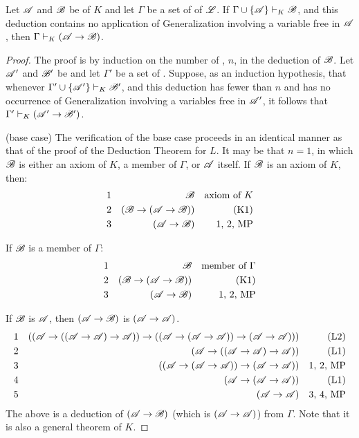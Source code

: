 \setcounter{definition}{7}
\begin{proposition}
  Let \(\mathscr{A}\) and \(\mathscr{B}\) be \wfs{} of \(K\) and let \(\Gamma\) be a set of \wfs{} of \(\mathscr{L}\). If \(\Gamma \cup \{\mathscr{A}\} \vdash_{K} \mathscr{B}\), and this deduction contains no application of Generalization involving a variable free in \(\mathscr{A}\), then \(\Gamma \vdash_{K} (\mathscr{A} \rightarrow \mathscr{B})\).

  \begin{proof}
    The proof is by induction on the number of \wfs{}, \(n\), in the deduction of \(\mathscr{B}\). Let \(\mathscr{A}'\) and \(\mathscr{B}'\) be \wfs{} and let \(\Gamma'\) be a set of \wfs{}. Suppose, as an induction hypothesis, that whenever \(\Gamma' \cup \{\mathscr{A}'\} \vdash_{K} \mathscr{B}'\), and this deduction has fewer than \(n\) \wfs{} and has no occurrence of Generalization involving a variables free in \(\mathscr{A}'\), it follows that \(\Gamma' \vdash_{K} (\mathscr{A}' \rightarrow \mathscr{B}')\).

    (base case) The verification of the base case proceeds in an identical manner as that of the proof of the Deduction Theorem for \(L\). It may be that \(n = 1\), in which \(\mathscr{B}\) is either an axiom of \(K\), a member of \(\Gamma\), or \(\mathscr{A}\) itself. If \(\mathscr{B}\) is an axiom of \(K\), then:
    \begin{align*}
      \text{1}&&
      \mathscr{B}&&
      \text{axiom of \(K\)}\\
      \text{2}&&
      (\mathscr{B} \rightarrow (\mathscr{A} \rightarrow \mathscr{B}))&&
      \text{(K1)}\\
      \text{3}&&
      (\mathscr{A} \rightarrow \mathscr{B})&&
      \text{1, 2, MP}
    \end{align*}

    If \(\mathscr{B}\) is a member of \(\Gamma\):
    \begin{align*}
      \text{1}&&
      \mathscr{B}&&
      \text{member of \(\Gamma\)}\\
      \text{2}&&
      (\mathscr{B} \rightarrow (\mathscr{A} \rightarrow \mathscr{B}))&&
      \text{(K1)}\\
      \text{3}&&
      (\mathscr{A} \rightarrow \mathscr{B})&&
      \text{1, 2, MP}
    \end{align*}

      If \(\mathscr{B}\) is \(\mathscr{A}\), then \((\mathscr{A} \rightarrow \mathscr{B})\) is \((\mathscr{A} \rightarrow \mathscr{A})\).
        \begin{align*}
          \text{1}&&
          ((\mathscr{A} \rightarrow ((\mathscr{A} \rightarrow \mathscr{A}) \rightarrow \mathscr{A})) \rightarrow ((\mathscr{A} \rightarrow (\mathscr{A} \rightarrow \mathscr{A})) \rightarrow (\mathscr{A} \rightarrow \mathscr{A})))&&
          \text{(L2)}\\
          \text{2}&&
          (\mathscr{A} \rightarrow ((\mathscr{A} \rightarrow \mathscr{A}) \rightarrow \mathscr{A}))&&
          \text{(L1)}\\
          \text{3}&&
          ((\mathscr{A} \rightarrow (\mathscr{A} \rightarrow \mathscr{A})) \rightarrow (\mathscr{A} \rightarrow \mathscr{A}))&&
          \text{1, 2, MP}\\
          \text{4}&&
          (\mathscr{A} \rightarrow (\mathscr{A} \rightarrow \mathscr{A}))&&
          \text{(L1)}\\
          \text{5}&&
          (\mathscr{A} \rightarrow \mathscr{A})&&
          \text{3, 4, MP}
        \end{align*}
        The above is a deduction of \((\mathscr{A} \rightarrow \mathscr{B})\) (which is \((\mathscr{A} \rightarrow \mathscr{A})\)) from \(\Gamma\). Note that it is also a general theorem of \(K\).


\end{proof}
\end{proposition}

